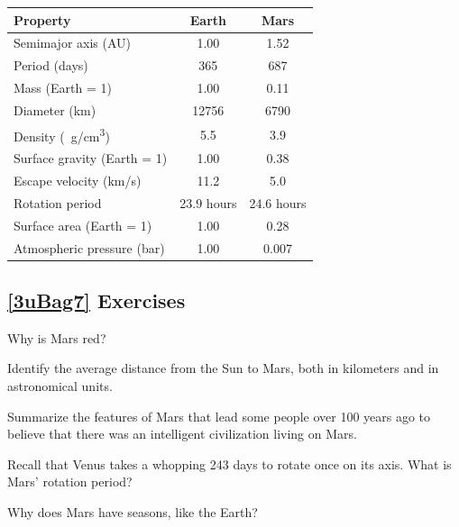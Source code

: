 \documentclass{article}
\numberwithin{equation}{section}
\numberwithin{figure}{section}
\begin{document}
\begin{center}
\begin{tabular}{|l|c|c|}
\hline
\textbf{Property} & \textbf{Earth} & \textbf{Mars}\\
\hline
Semimajor axis (AU)	& 1.00	& 1.52\\ \hline	
Period (days) & 365 & 687 \\	\hline	
Mass (Earth = 1) & 1.00 & 0.11 \\	\hline	
Diameter (km)	& \num{12756} & \num{6790}\\ \hline	
Density (\SI{}{g/cm^3})	& 5.5	&  3.9\\\hline	
Surface gravity (Earth = 1)	& 1.00	& 0.38\\	\hline	
Escape velocity (km/s)	& 11.2	& 5.0 \\	\hline	
Rotation period & 23.9 hours & 24.6 hours \\ \hline	
Surface area (Earth = 1) & 1.00 & 0.28 \\	\hline	
Atmospheric pressure (bar)	& 1.00 & 0.007\\ 
\hline
\end{tabular}
\end{center}

\subsection*{\ref{3uBag7} Exercises}

\begin{exercise}
    Why is Mars red?
\end{exercise}

\begin{exercise}
    Identify the average distance from the Sun to Mars, both in kilometers and in astronomical units.
\end{exercise}

\begin{exercise}
    Summarize the features of Mars that lead some people over 100 years ago to believe that there was an intelligent civilization living on Mars.
\end{exercise}

\begin{exercise}
    Recall that Venus takes a whopping 243 days to rotate once on its axis. What is Mars' rotation period?
\end{exercise}

\begin{exercise}
    Why does Mars have seasons, like the Earth?
\end{exercise}
\end{document}
